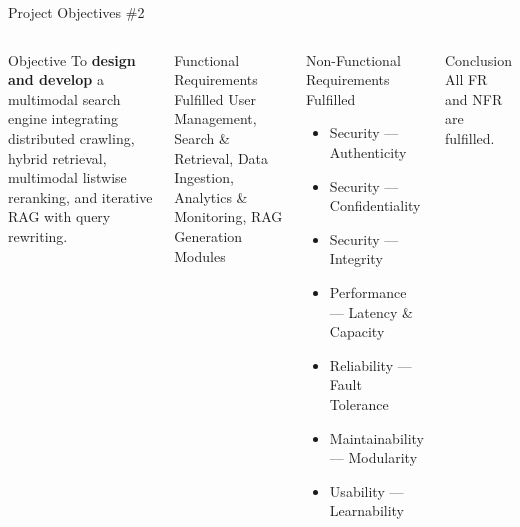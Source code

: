 \documentclass[aspectratio=169,xcolor=dvipsnames]{beamer}
\begin{document}
\begin{frame}{Project Objectives \#2}
  \begin{columns}[t]
    \begin{block}{Objective}
      To \textbf{design and develop} a multimodal search engine
      integrating distributed crawling, hybrid retrieval, multimodal
      listwise reranking, and iterative RAG with query rewriting.
    \end{block}
    \vspace{.4em}
    \begin{block}{Functional Requirements Fulfilled}
      \scriptsize
      User Management, Search \& Retrieval,
      Data Ingestion, Analytics \& Monitoring,
      RAG Generation Modules
    \end{block}
    \begin{block}{Non-Functional Requirements Fulfilled}
      \begin{itemize}\scriptsize
        \item Security — Authenticity
        \item Security — Confidentiality
        \item Security — Integrity
        \item Performance — Latency \& Capacity
        \item Reliability — Fault Tolerance
        \item Maintainability — Modularity
        \item Usability — Learnability
      \end{itemize}
    \end{block}
    \vspace{.3em}
    \begin{exampleblock}{Conclusion}
      \small All FR and NFR are fulfilled.
    \end{exampleblock}
  \end{columns}
\end{frame}
\end{document}
